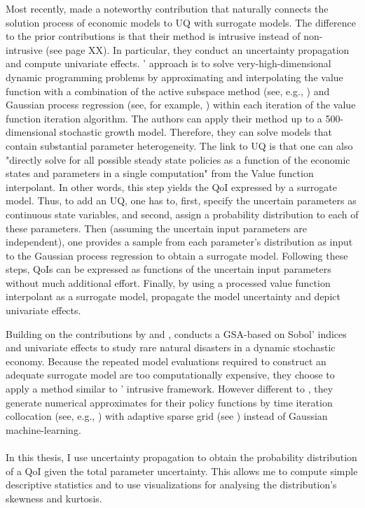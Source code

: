 \documentclass[a4paper,12pt]{article}
\begin{document}
Most recently, \cite{Scheidegger.2019} made a noteworthy contribution that naturally connects the solution process of economic models to UQ with surrogate models. The difference to the prior contributions is that their method is intrusive instead of non-intrusive (see page XX). In particular, they conduct an uncertainty propagation and compute univariate effects. \citeauthor{Scheidegger.2019}' approach is to solve very-high-dimensional dynamic programming problems by approximating and interpolating the value function with a combination of the active subspace method (see, e.g., \cite{Constantine.2015}) and Gaussian process regression (see, for example, \cite{Rasmussen.2005}) within each iteration of the value function iteration algorithm. The authors can apply their method up to a 500-dimensional stochastic growth model. Therefore, they can solve models that contain substantial parameter heterogeneity.
The link to UQ is that one can also "directly solve for all possible steady state policies as a function of the economic states and parameters in a single computation" \cite[p.~4]{Scheidegger.2019} from the Value function interpolant. In other words, this step yields the QoI expressed by a surrogate model. Thus, to add an UQ, one has to, first, specify the uncertain parameters as continuous state variables, and second, assign a probability distribution to each of these parameters. Then (assuming the uncertain input parameters are independent), one provides a sample from each parameter's distribution as input to the Gaussian process regression to obtain a surrogate model. Following these steps, QoIs can be expressed as functions of the uncertain input parameters without much additional effort. Finally, by using a processed value function interpolant as a surrogate model, \citeauthor{Scheidegger.2019} propagate the model uncertainty and depict univariate effects.

Building on the contributions by \cite{Harenberg.2019} and \cite{Scheidegger.2019}, \cite{Usui.2019} conducts a GSA-based on Sobol' indices and univariate effects to study rare natural disasters in a dynamic stochastic economy. Because the repeated model evaluations required to construct an adequate surrogate model are too computationally expensive, they choose to apply a  method similar to \citeauthor{Scheidegger.2019}' intrusive framework. However different to \cite{Scheidegger.2019}, they generate numerical approximates for their policy functions by time iteration collocation (see, e.g., \cite{Judd.1998}) with adaptive sparse grid (see  \cite{Scheidegger.2018}) instead of Gaussian machine-learning.\\
\\
In this thesis, I use uncertainty propagation to obtain the probability distribution of a QoI given the total parameter uncertainty. This allows me to compute simple descriptive statistics and to use visualizations for analysing the distribution's skewness and kurtosis.
\end{document}
